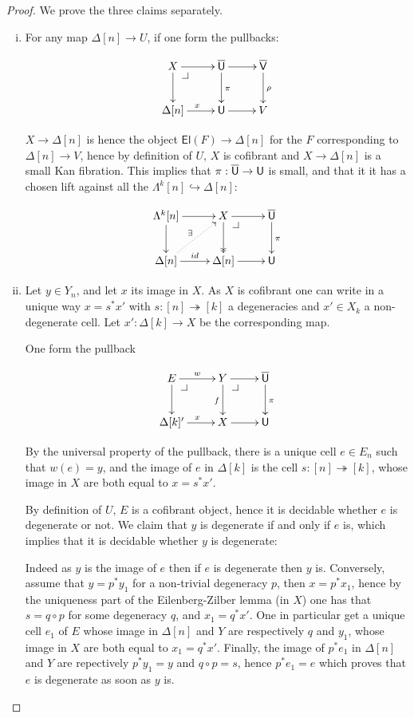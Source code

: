 \documentclass[reqno,10pt,a4paper,oneside,draft]{amsart}
\begin{document}
\begin{proof} We prove the three claims separately.
\begin{enumerate}[(i)] 
\item For any map $\Delta[n] \rightarrow U$, if one form the pullbacks:

\[
\xymatrix{
X \ar[r] \ar[d] \drpullback & \UU \ar[d]^\pi \ar[r] & \VV \ar[d]^{\rho} \\
\Delta[n] \ar[r]^{x} & \U \ar[r] & V }
\]


$X \rightarrow \Delta[n]$ is hence the object $ \mathsf{El}(F) \rightarrow \Delta[n]$ for the $F$ corresponding to $\Delta[n] \rightarrow V$, hence by definition of $U$, $X$ is cofibrant and $X \rightarrow \Delta[n]$ is a small Kan fibration. This implies that $\pi:\overline{\mathsf{U}} \rightarrow \mathsf{U}$ is small, and that it it has a chosen lift against all the $\Lambda^k[n] \hookrightarrow \Delta[n]$:


\[
\xymatrix{
\Lambda^k[n] \ar[r] \ar[d] & X \drpullback \ar@{->>}[d] \ar[r] & \UU \ar[d]^\pi \\
\Delta[n] \ar[r]^{id} \ar@{.>}[ur]^{\exists} & \Delta[n] \ar[r] & \U  }
\]



\item 

Let $y \in Y_n$, and let $x$ its image in $X$. As $X$ is cofibrant one can write in a unique way $x=s^* x'$ with $s:[n] \twoheadrightarrow [k]$ a degeneracies and $x' \in X_k$ a non-degenerate cell. Let $x': \Delta[k] \rightarrow X$ be the corresponding map.

One form the pullback

\[
\xymatrix{
E \ar[r]^w \ar[d] \drpullback & Y \ar[r] \ar[d]_f \drpullback & \UU \ar[d]^\pi \\
\Delta[k] \ar[r]^x' & X \ar[r] & \U }
\]

By the universal property of the pullback, there is a unique cell $e \in E_n$ such that $w(e)=y$, and the image of $e$ in $\Delta[k]$ is the cell $s:[n] \twoheadrightarrow [k]$, whose image in $X$ are both equal to $x=s^* x'$.

By definition of $U$, $E$ is a cofibrant object, hence it is decidable whether $e$ is degenerate or not. We claim that $y$ is degenerate if and only if $e$ is, which implies that it is decidable whether $y$ is degenerate:

Indeed as $y$ is the image of $e$ then if $e$ is degenerate then $y$ is. Conversely, assume that $y=p^* y_1$ for a non-trivial degeneracy $p$, then $x=p^* x_1$, hence by the uniqueness part of the Eilenberg-Zilber lemma (in $X$) one has that $s=q \circ p$ for some degeneracy $q$, and $x_1 = q^* x'$. One in particular get a unique cell $e_1$ of $E$ whose image in $\Delta[n]$ and $Y$ are respectively $q$ and $y_1$, whose image in $X$ are both equal to $x_1=q^* x'$. Finally, the image of $p^* e_1$ in $\Delta[n]$ and $Y$ are repectively $p^* y_1 =y$ and $q \circ p =s$, hence $p^* e_1 =e$ which proves that $e$ is degenerate as soon as $y$ is.




\end{enumerate}
\end{proof}
\end{document}
